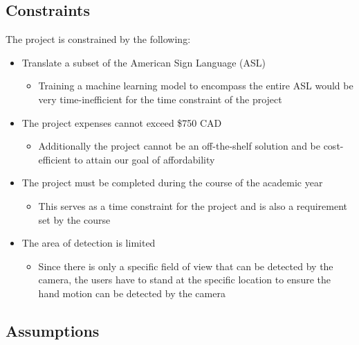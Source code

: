 \documentclass[12pt]{article}
\begin{document}
\subsection{Constraints}
The project is constrained by the following:
\begin{itemize}
  \item Translate a subset of the American Sign Language (ASL)
  \begin{itemize}
    \item Training a machine learning model to encompass the entire ASL would be very time-inefficient for the time constraint of the project
  \end{itemize}
    \item The project expenses cannot exceed \$750 CAD
  \begin{itemize}
    \item Additionally the project cannot be an off-the-shelf solution and be cost-efficient to attain our goal of affordability
  \end{itemize}
  \item The project must be completed during the course of the academic year
  \begin{itemize}
    \item This serves as a time constraint for the project and is also a requirement set by the course
  \end{itemize}
  \item The area of detection is limited
  \begin{itemize}
    \item Since there is only a specific field of view that can be detected by the camera, the users have to stand at the specific location 
    to ensure the hand motion can be detected by the camera
  \end{itemize}
\end{itemize}

\subsection{Assumptions}
\end{document}
